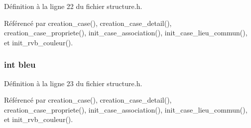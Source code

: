 D\'{e}finition \`{a} la ligne 22 du fichier structure.h.

R\'{e}f\'{e}renc\'{e} par creation\_\-case(), creation\_\-case\_\-detail(), creation\_\-case\_\-propriete(), init\_\-case\_\-association(), init\_\-case\_\-lieu\_\-commun(), et init\_\-rvb\_\-couleur().
\subsubsection{\setlength{\rightskip}{0pt plus 5cm}int {\bf bleu}}\label{structrvb__couleur_ffc4de061aea007870237c665d22177c}




D\'{e}finition \`{a} la ligne 23 du fichier structure.h.

R\'{e}f\'{e}renc\'{e} par creation\_\-case(), creation\_\-case\_\-detail(), creation\_\-case\_\-propriete(), init\_\-case\_\-association(), init\_\-case\_\-lieu\_\-commun(), et init\_\-rvb\_\-couleur().